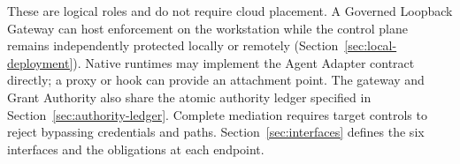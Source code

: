 These are logical roles and do not require cloud placement. A Governed Loopback Gateway can host enforcement on the workstation while the control plane remains independently protected locally or remotely (Section~\ref{sec:local-deployment}). Native runtimes may implement the Agent Adapter contract directly; a proxy or hook can provide an attachment point. The gateway and Grant Authority also share the atomic authority ledger specified in Section~\ref{sec:authority-ledger}. Complete mediation requires target controls to reject bypassing credentials and paths. Section~\ref{sec:interfaces} defines the six interfaces and the obligations at each endpoint.
\clearpage
